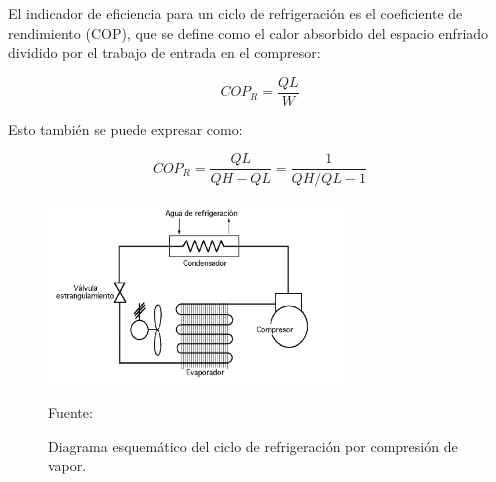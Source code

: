 El indicador de eficiencia para un ciclo de refrigeración es el coeficiente de rendimiento (COP), que se define como el calor absorbido del espacio enfriado dividido por el trabajo de entrada en el compresor:

\begin{equation}
	COP_R = \frac{QL}{W} \label{eq:COP_definition}
\end{equation}

Esto también se puede expresar como:

\begin{equation}
	COP_R = \frac{QL}{QH - QL} = \frac{1}{QH / QL - 1} \label{eq:COP_expression}
\end{equation}

\begin{figure}[H]
	\centering
	\includegraphics[width=0.7\textwidth]{figures/ref-comp.png}
	\caption{Diagrama esquemático del ciclo de refrigeración por compresión de vapor.} Fuente: \cite{theoms-2023}
	\label{fig:ref-comp}
\end{figure} 
